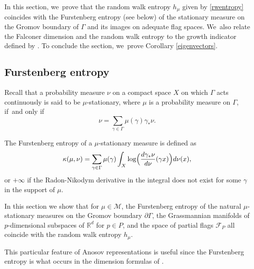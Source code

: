 \documentclass[10pt,a4paper]{amsart}
\newcommand{\R}{\mathbb{R}}
\newcommand{\F}{\mathcal{F}}
\newcommand{\M}{\mathcal M}
\let\g\gamma
\begin{document}
In this section, we~prove that the random walk entropy \(h_\mu \) given by \eqref{rwentropy} coincides with the Furstenberg entropy (see below) of the stationary measure on the Gromov boundary of \(\Gamma\) and its images on adequate flag spaces. We~also relate the Falconer dimension and the random walk entropy to the growth indicator defined by \cite{Qui02a}. To conclude the section, we~prove Corollary \ref{eigenvectors}.

\subsection{Furstenberg entropy}

Recall that a probability measure \(\nu\) on a compact space \(X\) on which \(\Gamma\) acts continuously is said to be \(\mu\)-stationary, where \(\mu\) is a probability measure on \(\Gamma\), if~and only if
\[
\nu = \sum_{\gamma \in \Gamma}\mu(\gamma)\gamma_*\nu.
\]

The Furstenberg entropy of a \(\mu\)-stationary measure is defined as
\[
\kappa(\mu,\nu) = \sum_{\gamma \in \Gamma} \mu(\gamma) \int_{X} \log\Bigl(\frac{d\gamma_*\nu}{d\nu}(\g x)\Bigr)d\nu(x),
\]
or \(+\infty\) if the Radon-Nikodym derivative in the integral does not exist for some \(\gamma\) in the support of \(\mu\).

In this section we show that for \(\mu \in \M\), the Furstenberg entropy of the natural \(\mu\)-stationary measures on the Gromov boundary \(\partial\Gamma\), the Grassmannian manifolds of \(p\)-dimensional subspaces of \(\R^d\) for \(p \in P\), and the space of partial flags \(\F_P\) all coincide with the random walk entropy \(h_\mu\).

This particular feature of Anosov representations is useful since the Furstenberg entropy is what occurs in the dimension formulas of \cite{LL23}.

\end{document}
